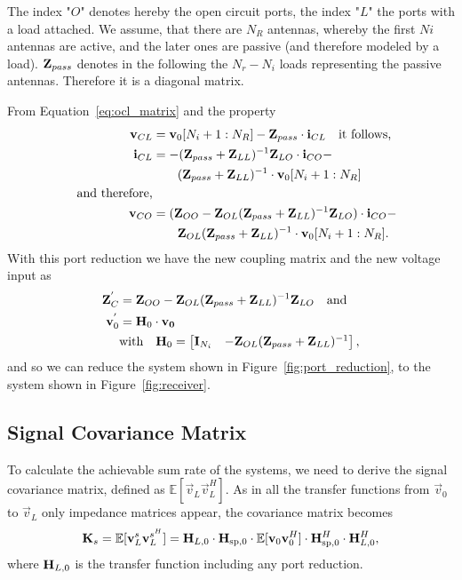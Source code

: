 The index "$O$" denotes hereby the open circuit ports, the index "$L$" the ports with a load attached.
We assume, that there are $N_R$ antennas, whereby the first $Ni$ antennas are active, and the later ones are passive (and therefore modeled by a load).
$\mathbf{Z}_{pass}$ denotes in the following the $N_r - N_i$ loads representing the passive antennas.
Therefore it is a diagonal matrix.

From Equation~\eqref{eq:ocl_matrix} and the property
\begin{align}
\mathbf{v}_{CL} &= \mathbf{v}_0[N_i+1:N_R]-\mathbf{Z}_{pass}\cdot\mathbf{i}_{CL}\quad\text{it follows,}\\
\mathbf{i}_{CL} &= -(\mathbf{Z}_{pass} + \mathbf{Z}_{LL})^{-1}\mathbf{Z}_{LO}\cdot\mathbf{i}_{CO} -\\\nonumber
&\qquad (\mathbf{Z}_{pass} + \mathbf{Z}_{LL})^{-1}\cdot\mathbf{v}_{0}[N_i+1:N_R]\\\nonumber\quad\text{and therefore,}&\\
\mathbf{v}_{CO} &= (\mathbf{Z}_{OO}-\mathbf{Z}_{OL}(\mathbf{Z}_{pass} + \mathbf{Z}_{LL})^{-1}\mathbf{Z}_{LO})\cdot\mathbf{i}_{CO} -\\\nonumber&\qquad \mathbf{Z}_{OL}(\mathbf{Z}_{pass} + \mathbf{Z}_{LL})^{-1}\cdot\mathbf{v}_0[N_i+1:N_R].
\end{align}
With this port reduction we have the new coupling matrix and the new voltage input as
\begin{align}
\mathbf{Z}_C^{'}&= \mathbf{Z}_{OO} - \mathbf{Z}_{OL}(\mathbf{Z}_{pass} + \mathbf{Z}_{LL})^{-1}\mathbf{Z}_{LO}\quad\text{and}\\
\mathbf{v}_0^{'} &= \mathbf{H}_0 \cdot \mathbf{v_0}\\\nonumber
&\text{with}\quad\mathbf{H}_0=
\begin{bmatrix}
\mathbf{I}_{N_i} & -\mathbf{Z}_{OL}(\mathbf{Z}_{pass} + \mathbf{Z}_{LL})^{-1}
\end{bmatrix},
\end{align}
and so we can reduce the system shown in Figure~\ref{fig:port_reduction}, to the system shown in Figure~\ref{fig:receiver}.

\subsection{Signal Covariance Matrix}
\label{sec:sig_cov}
To calculate the achievable sum rate of the systems, we need to derive the signal covariance matrix, defined as $\mathbb{E}[\vec{v}_L\vec{v}_L^H]$.
As in all the transfer functions from $\vec{v}_0$ to $\vec{v}_L$ only impedance matrices appear, the covariance matrix becomes
\begin{equation}
\label{eq:sig_cov}
\mathbf{K}_s=\mathbb{E}[\mathbf{v}_L^s\mathbf{v}_L^{s^H}] = 
	\mathbf{H}_{L,0}\cdot \mathbf{H}_{\text{sp},0} 
	\cdot\mathbb{E}[\mathbf{v}_0\mathbf{v}_0^H]\cdot
	\mathbf{H}_{\text{sp},0}^H \cdot \mathbf{H}_{L,0}^H,
\end{equation}
where $\mathbf{H}_{L,0}$ is the transfer function including any port reduction.

